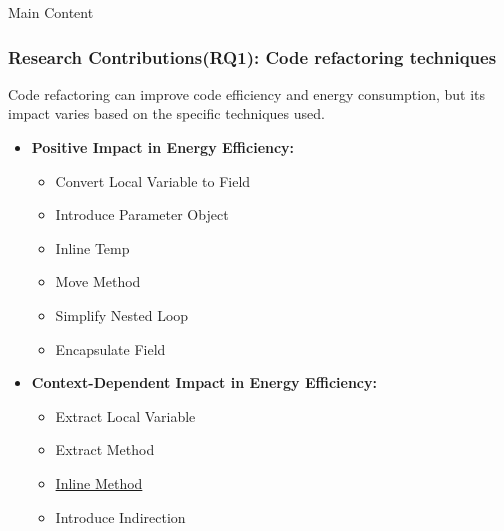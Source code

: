 \documentclass{beamer}
\begin{document}
\begin{frame}{Main Content}
  \frametitle{Research Contributions(RQ1): Code refactoring techniques}

\small {\footnotesize Code refactoring can improve code efficiency and energy consumption, but its impact varies based on the specific techniques used.}
\hypertarget{back}{}
  \begin{itemize}
     \item \textbf{\footnotesize Positive Impact in Energy Efficiency:}
     \begin{itemize}
        \item \footnotesize Convert Local Variable to Field
        \item \footnotesize Introduce Parameter Object
        \item \footnotesize Inline Temp
        \item \footnotesize Move Method
        \item \footnotesize Simplify Nested Loop
        \item \footnotesize Encapsulate Field
    \end{itemize}
    
    \item \textbf{\footnotesize Context-Dependent Impact in Energy Efficiency:}
     \begin{itemize}
        \item \footnotesize Extract Local Variable
        \item \footnotesize Extract Method
        \item \footnotesize \hyperlink{codeRefactorSlide}{Inline Method}
        \item \footnotesize Introduce Indirection
    \end{itemize}

  \end{itemize}

\end{frame}
\end{document}
